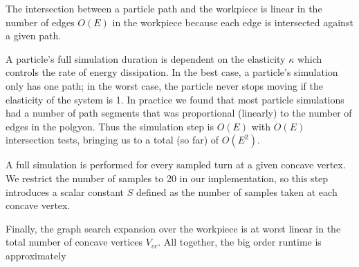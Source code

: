 The intersection between a particle path and the workpiece is linear in the number of edges $O(E)$ in the workpiece because each edge is intersected against a given path.

A particle's full simulation duration is dependent on the elasticity $\kappa$ which controls the rate of energy dissipation. In the best case, a particle's simulation only has one path; in the worst case, the particle never stops moving if the elasticity of the system is 1. In practice we found that most particle simulations had a number of path segments that was proportional (linearly) to the number of edges in the polgyon. Thus the simulation step is $O(E)$ with $O(E)$ intersection tests, bringing us to a total (so far) of $O(E^2).$

A full simulation is performed for every sampled turn at a given concave vertex. We restrict the number of samples to 20 in our implementation, so this step introduces a scalar constant $S$ defined as the number of samples taken at each concave vertex.

Finally, the graph search expansion over the workpiece is at worst linear in the total number of concave vertices $V_{cc}$. All together, the big order runtime is approximately

 {
  \label{eq:bigo}
}
